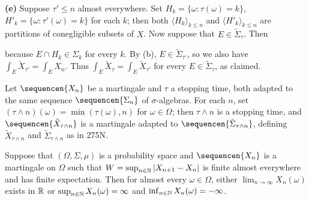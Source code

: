 {\medskip

{\bf (e)} Suppose $\tau'\le n$ almost everywhere.   Set
$H_k=\{\omega:\tau(\omega)=k\}$,
$H'_k=\{\omega:\tau'(\omega)=k\}$ for each $k$;  then both
$\langle H_k\rangle_{k\le n}$ and $\langle H'_k\rangle_{k\le n}$ are
partitions of conegligible subsets of $X$.
Now suppose that $E\in\tilde\Sigma_{\tau}$.   Then


\noindent because $E\cap H_k\in\Sigma_k$ for every $k$.   By (b),
$E\in\tilde\Sigma_{\tau'}$, so we also have
$\int_E\tilde X_{\tau'}=\int_EX_n$.   Thus
$\int_E\tilde X_{\tau}=\int_E\tilde X_{\tau'}$ for every
$E\in\tilde\Sigma_{\tau}$, as claimed.
}%

 Let $\sequencen{X_n}$ be a martingale and
$\tau$ a stopping time, both adapted to the same sequence
$\sequencen{\Sigma_n}$ of
$\sigma$-algebras.   For each $n$, set $(\tau\wedge
n)(\omega)=\min(\tau(\omega),n)$ for $\omega\in\Omega$;  then
$\tau\wedge n$ is a stopping time, and $\sequencen{\tilde X_{\tau\wedge
n}}$ is a martingale
adapted to $\sequencen{\tilde\Sigma_{\tau\wedge n}}$, defining
$\tilde X_{\tau\wedge n}$ and $\tilde\Sigma_{\tau\wedge n}$ as in 275N.


 Suppose that $(\Omega,\Sigma,\mu)$ is a
probability space and $\sequencen{X_n}$ is a martingale on $\Omega$ such
that $W=\sup_{n\in\Bbb N}|X_{n+1}-X_n|$ is finite almost everywhere and
has finite expectation.   Then for almost every $\omega\in\Omega$,
either $\lim_{n\to\infty}X_n(\omega)$ exists in $\Bbb R$ or
$\sup_{n\in\Bbb N}X_n(\omega)=\infty$ and $\inf_{n\in\Bbb
N}X_n(\omega)=-\infty$.


